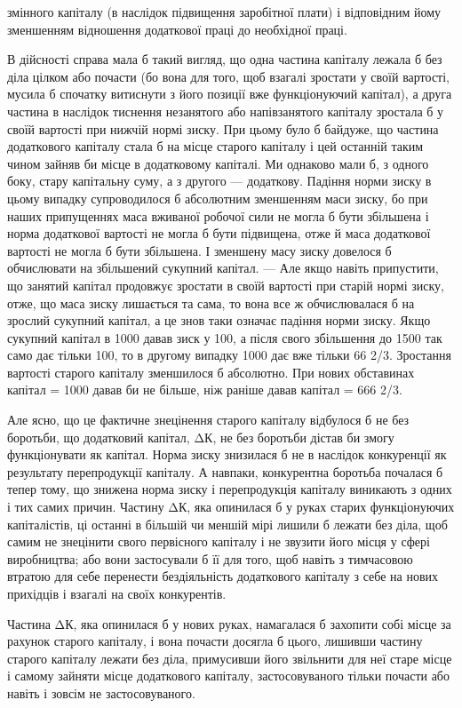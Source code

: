 змінного капіталу (в наслідок підвищення заробітної плати) і відповідним
йому зменшенням відношення додаткової праці до
необхідної праці.

В дійсності справа мала б такий вигляд, що одна частина капіталу
лежала б без діла цілком або почасти (бо вона для того, щоб
взагалі зростати у своїй вартості, мусила б спочатку витиснути з
його позиції вже функціонуючий капітал), а друга частина в наслідок
тиснення незанятого або напівзанятого капіталу зростала б
у своїй вартості при нижчій нормі зиску. При цьому було б байдуже,
що частина додаткового капіталу стала б на місце старого капіталу
і цей останній таким чином зайняв би місце в додатковому
капіталі. Ми однаково мали б, з одного боку, стару капітальну
суму, а з другого — додаткову. Падіння норми зиску в цьому
випадку супроводилося б абсолютним зменшенням маси зиску, бо
при наших припущеннях маса вживаної робочої сили не могла б
бути збільшена і норма додаткової вартості не могла б бути підвищена,
отже й маса додаткової вартості не могла б бути збільшена.
І зменшену масу зиску довелося б обчислювати на збільшений
сукупний капітал. — Але якщо навіть припустити, що занятий
капітал продовжує зростати в своїй вартості при старій нормі
зиску, отже, що маса зиску лишається та сама, то вона все ж
обчислювалася б на зрослий сукупний капітал, а це знов таки
означає падіння норми зиску. Якщо сукупний капітал в 1000 давав
зиск у 100, а після свого збільшення до 1500 так само дає
тільки 100, то в другому випадку 1000 дає вже тільки 66 2/3. Зростання
вартості старого капіталу зменшилося б абсолютно. При
нових обставинах капітал = 1000 давав би не більше, ніж раніше
давав капітал = 666 2/3.

Але ясно, що це фактичне знецінення старого капіталу
відбулося б не без боротьби, що додатковий капітал, ΔК, не без
боротьби дістав би змогу функціонувати як капітал. Норма зиску
знизилася б не в наслідок конкуренції як результату перепродукції
капіталу. А навпаки, конкурентна боротьба почалася б тепер
тому, що знижена норма зиску і перепродукція капіталу виникають
з одних і тих самих причин. Частину ΔК, яка опинилася б
у руках старих функціонуючих капіталістів, ці останні в більшій
чи меншій мірі лишили б лежати без діла, щоб самим не знецінити
свого первісного капіталу і не звузити його місця у
сфері виробництва; або вони застосували б її для того, щоб навіть
з тимчасовою втратою для себе перенести бездіяльність
додаткового капіталу з себе на нових прихідців і взагалі на
своїх конкурентів.

Частина ΔК, яка опинилася б у нових руках, намагалася б
захопити собі місце за рахунок старого капіталу, і вона почасти
досягла б цього, лишивши частину старого капіталу лежати
без діла, примусивши його звільнити для неї старе місце і самому
зайняти місце додаткового капіталу, застосовуваного тільки
почасти або навіть і зовсім не застосовуваного.

